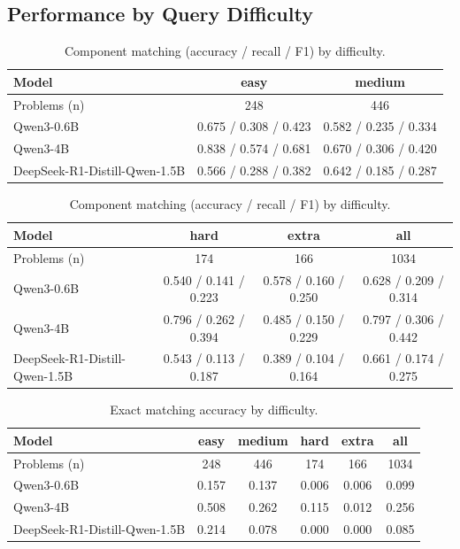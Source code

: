 \subsection{Performance by Query Difficulty}
\label{sec:by-difficulty}

\begin{table}[H]
\centering
\footnotesize
\caption{Component matching (accuracy / recall / F1) by difficulty.}
\label{tab:difficulty-component}
\begin{tabular}{lcc}
\toprule
Model & easy & medium \\
\midrule
Problems (n) & 248 & 446 \\
Qwen3-0.6B & 0.675 / 0.308 / 0.423 & 0.582 / 0.235 / 0.334 \\
Qwen3-4B & 0.838 / 0.574 / 0.681 & 0.670 / 0.306 / 0.420 \\
DeepSeek-R1-Distill-Qwen-1.5B & 0.566 / 0.288 / 0.382 & 0.642 / 0.185 / 0.287 \\
\bottomrule
\end{tabular}

\vspace{0.5em}

\begin{tabular}{lccc}
\toprule
Model & hard & extra & all \\
\midrule
Problems (n) & 174 & 166 & 1034 \\
Qwen3-0.6B & 0.540 / 0.141 / 0.223 & 0.578 / 0.160 / 0.250 & 0.628 / 0.209 / 0.314 \\
Qwen3-4B & 0.796 / 0.262 / 0.394 & 0.485 / 0.150 / 0.229 & 0.797 / 0.306 / 0.442 \\
DeepSeek-R1-Distill-Qwen-1.5B & 0.543 / 0.113 / 0.187 & 0.389 / 0.104 / 0.164 & 0.661 / 0.174 / 0.275 \\
\bottomrule
\end{tabular}
\end{table}

\begin{table}[H]
\centering
\footnotesize
\caption{Exact matching accuracy by difficulty.}
\label{tab:difficulty-exact}
\begin{tabular}{lccccc}
\toprule
Model & easy & medium & hard & extra & all \\
\midrule
Problems (n) & 248 & 446 & 174 & 166 & 1034 \\
Qwen3-0.6B & 0.157 & 0.137 & 0.006 & 0.006 & 0.099 \\
Qwen3-4B & 0.508 & 0.262 & 0.115 & 0.012 & 0.256 \\
DeepSeek-R1-Distill-Qwen-1.5B & 0.214 & 0.078 & 0.000 & 0.000 & 0.085 \\
\bottomrule
\end{tabular}
\end{table}

